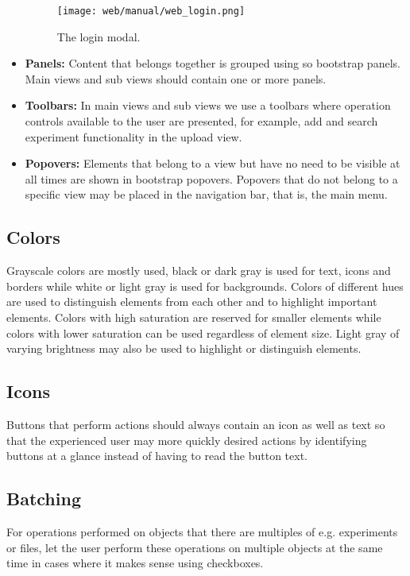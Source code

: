 \begin{itemize}
\begin{figure}
\centering
\texttt{[image: web/manual/web\_login.png]}
\caption{The login modal.}
\label{fig:web_search_login1}
\end{figure}

    \item \textbf{Panels:}
Content that belongs together is grouped using so bootstrap panels. Main views and sub views should contain one or more panels.
    
    \item \textbf{Toolbars:}
In main views and sub views we use a toolbars where operation controls available to the user are presented, for example, add and search experiment functionality in the upload view.
    
    \item \textbf{Popovers:}
Elements that belong to a view but have no need to be visible at all times are shown in bootstrap popovers. Popovers that do not belong to a specific view may be placed in the navigation bar, that is, the main menu.
\end{itemize}

\subsection{Colors}
Grayscale colors are mostly used, black or dark gray is used for text, icons and borders while white or light gray is used for backgrounds. Colors of different hues are used to distinguish elements from each other and to highlight important elements. Colors with high saturation are reserved for smaller elements while colors with lower saturation can be used regardless of element size. Light gray of varying brightness may also be used to highlight or distinguish elements.

\subsection{Icons}
Buttons that perform actions should always contain an icon as well as text so that the experienced user may more quickly desired actions by identifying buttons at a glance instead of having to read the button text. 

\subsection{Batching}
For operations performed on objects that there are multiples of e.g. experiments or files, let the user perform these operations on multiple objects at the same time in cases where it makes sense using checkboxes.

